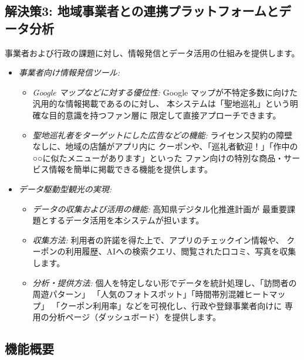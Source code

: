 \documentclass{docs}
\begin{document}
\subsection{解決策3: 地域事業者との連携プラットフォームとデータ分析}
事業者および行政の課題に対し、情報発信とデータ活用の仕組みを提供します。
\begin{itemize}
	\item \emph{事業者向け情報発信ツール:}
	\begin{itemize}
		\item \emph{Google マップなどに対する優位性:}
		Google マップが不特定多数に向けた汎用的な情報掲載であるのに対し、
		本システムは「聖地巡礼」という明確な目的意識を持つファン層に
		限定して直接アプローチできます。
		\item \emph{聖地巡礼者をターゲットにした広告などの機能:}
		ライセンス契約\cite{nri2024}の障壁なしに、地域の店舗がアプリ内に
		クーポンや、「巡礼者歓迎！」「作中の○○に似たメニューがあります」といった
		ファン向けの特別な商品・サービス情報を簡単に掲載できる機能を提供します。
	\end{itemize}
	\item \emph{データ駆動型観光の実現:}
	\begin{itemize}
		\item \emph{データの収集および活用の機能:}
		高知県デジタル化推進計画\cite{kochi_dx_plan}が
		最重要課題とするデータ活用を本システムが担います。
		\item \emph{収集方法:}
		利用者の許諾を得た上で、アプリのチェックイン情報や、
		クーポンの利用履歴、AIへの検索クエリ、閲覧された口コミ、写真を収集します。
		\item \emph{分析・提供方法:}
		個人を特定しない形でデータを統計処理し、「訪問者の周遊パターン」
		「人気のフォトスポット」「時間帯別混雑ヒートマップ」
		「クーポン利用率」などを可視化し、行政や登録事業者向けに
		専用の分析ページ（ダッシュボード）を提供します。
	\end{itemize}
\end{itemize}

\subsection{機能概要}
\end{document}
